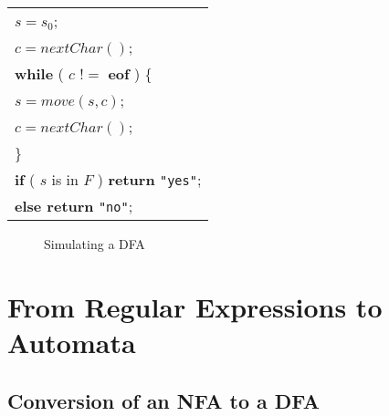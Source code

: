 \documentclass[12pt,a4paper,twoside,openany]{book}
\begin{document}
\begin{center}
    \begin{tabular}{l}
        $s=s_0$;\\
        $c=nextChar()$;\\
        \textbf{while} ( $c$ !$=$ \textbf{eof} ) \{\\
        \qquad $s=move(s,c)$;\\
        \qquad $c=nextChar()$;\\
        \}\\
        \textbf{if} ( $s$ is in $F$ ) \textbf{return} \verb|"yes"|;\\
        \textbf{else return} \verb|"no"|;
    \end{tabular}
\end{center}
\begin{figure}[htbp]
    \caption{Simulating a DFA}
    \label{Figure:3.27}
\end{figure}

\section{From Regular Expressions to Automata}
\subsection{Conversion of an NFA to a DFA}
\end{document}
